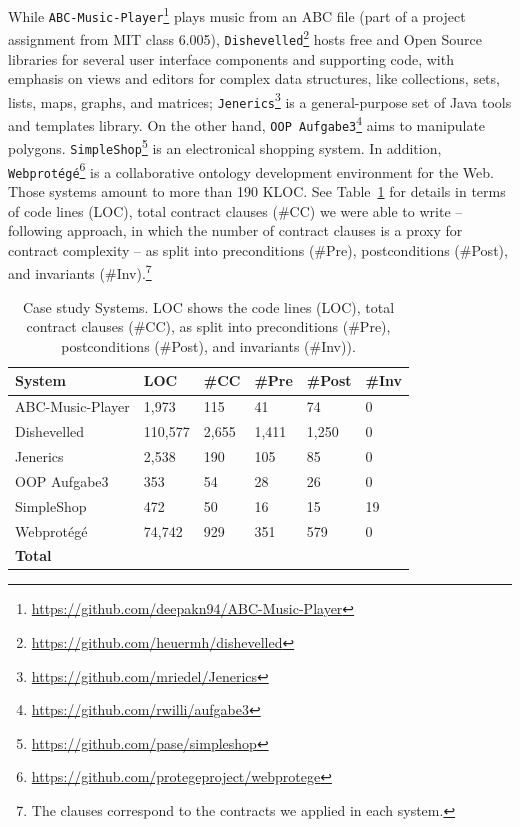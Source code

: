 While \texttt{ABC-Music-Player}\footnote{\url{https://github.com/deepakn94/ABC-Music-Player}}
plays music from an ABC file (part of a project assignment from MIT class
6.005), \texttt{Dishevelled}\footnote{\url{https://github.com/heuermh/dishevelled}} hosts
free and Open Source libraries for several user interface components and
supporting code, with emphasis on views and editors for complex data structures, like collections, sets, lists, maps, graphs, and
matrices; \texttt{Jenerics}\footnote{\url{https://github.com/mriedel/Jenerics}} is a general-purpose set of Java tools and templates library.
On the other hand, \texttt{OOP
Aufgabe3}\footnote{\url{https://github.com/rwilli/aufgabe3}} aims to manipulate
polygons. \texttt{SimpleShop}\footnote{\url{https://github.com/pase/simpleshop}} is an
electronical shopping system. In addition,
\texttt{Webprot\'{e}g\'{e}}\footnote{\url{https://github.com/protegeproject/webprotege}}
is a collaborative ontology development environment for the Web. Those systems amount to more than 190 KLOC. See Table~\ref{tab:Units} for details in
terms of code lines (LOC), total contract clauses (\#CC) we were able to write
-- following \cite{Estler-etal14} approach, in which the number of contract clauses is a proxy for contract complexity -- as split
into preconditions (\#Pre), postconditions (\#Post), and invariants (\#Inv).\footnote{The clauses
correspond to the contracts we applied in each system.}

\begin{table}[ht]
\caption{Case study Systems. LOC shows the code lines (LOC), total contract clauses (\#CC), as split
into preconditions (\#Pre), postconditions (\#Post), and invariants (\#Inv)).}
\label{tab:Units}
\centering
\begin{tabular}{llllll}
\toprule
\bfseries System &  \bfseries LOC & 
\bfseries \#CC &  \bfseries \#Pre &  \bfseries \#Post &
 \bfseries \#Inv \\ \hline
ABC-Music-Player & 1,973 & 115 & 41 & 74 & 0 \\ 
Dishevelled & 110,577 & 2,655 & 1,411 & 1,250 & 0 \\ 
Jenerics & 2,538 & 190 & 105 & 85 & 0 \\ 
OOP Aufgabe3 & 353 & 54 & 28 & 26 & 0 \\
SimpleShop & 472 & 50 & 16 & 15 & 19 \\
Webprot\'{e}g\'{e} & 74,742 & 929 & 351 & 579 & 0 \\ \hline

 \bfseries Total &  \bfseries \totalCode{} &  \bfseries
\totalClauses{} &  \bfseries \totalPre{} &  \bfseries \totalPost{} &
 \bfseries \totalInv{}
\\
\bottomrule
\end{tabular}
\end{table}

